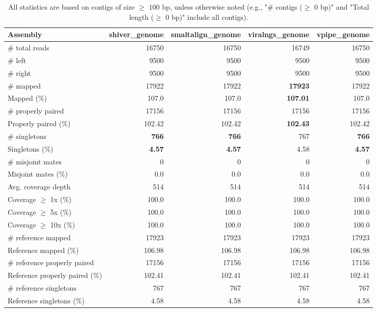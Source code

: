 \documentclass[12pt,a4paper]{article}
\begin{document}
\begin{table}[ht]
\begin{center}
\caption{All statistics are based on contigs of size $\geq$ 100 bp, unless otherwise noted (e.g., "\# contigs ($\geq$ 0 bp)" and "Total length ($\geq$ 0 bp)" include all contigs).}
\begin{tabular}{|l*{4}{|r}|}
\hline
Assembly & shiver\_genome & smaltalign\_genome & viralngs\_genome & vpipe\_genome \\ \hline
\# total reads & 16750 & 16750 & 16749 & 16750 \\ \hline
\# left & 9500 & 9500 & 9500 & 9500 \\ \hline
\# right & 9500 & 9500 & 9500 & 9500 \\ \hline
\# mapped & 17922 & 17922 & {\bf 17923} & 17922 \\ \hline
Mapped (\%) & 107.0 & 107.0 & {\bf 107.01} & 107.0 \\ \hline
\# properly paired & 17156 & 17156 & 17156 & 17156 \\ \hline
Properly paired (\%) & 102.42 & 102.42 & {\bf 102.43} & 102.42 \\ \hline
\# singletons & {\bf 766} & {\bf 766} & 767 & {\bf 766} \\ \hline
Singletons (\%) & {\bf 4.57} & {\bf 4.57} & 4.58 & {\bf 4.57} \\ \hline
\# misjoint mates & 0 & 0 & 0 & 0 \\ \hline
Misjoint mates (\%) & 0.0 & 0.0 & 0.0 & 0.0 \\ \hline
Avg. coverage depth & 514 & 514 & 514 & 514 \\ \hline
Coverage $\geq$ 1x (\%) & 100.0 & 100.0 & 100.0 & 100.0 \\ \hline
Coverage $\geq$ 5x (\%) & 100.0 & 100.0 & 100.0 & 100.0 \\ \hline
Coverage $\geq$ 10x (\%) & 100.0 & 100.0 & 100.0 & 100.0 \\ \hline
\# reference mapped & 17923 & 17923 & 17923 & 17923 \\ \hline
Reference mapped (\%) & 106.98 & 106.98 & 106.98 & 106.98 \\ \hline
\# reference properly paired & 17156 & 17156 & 17156 & 17156 \\ \hline
Reference properly paired (\%) & 102.41 & 102.41 & 102.41 & 102.41 \\ \hline
\# reference singletons & 767 & 767 & 767 & 767 \\ \hline
Reference singletons (\%) & 4.58 & 4.58 & 4.58 & 4.58 \\ \hline

\end{tabular}
\end{center}
\end{table}
\end{document}
